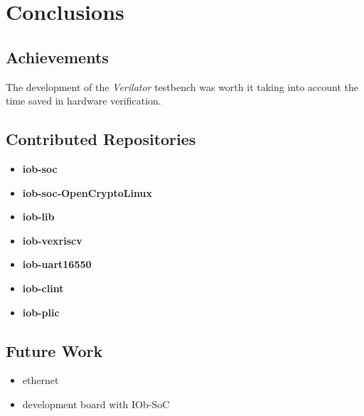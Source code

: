 \chapter{Conclusions}
\label{chapter:conclusions}

\section{Achievements}
\label{section:achievements}
The development of the \textit{Verilator} testbench was worth it taking into account the time saved in hardware verification.

\section{Contributed Repositories}
\label{section:contributions}
\begin{itemize}
    \item \textbf{iob-soc}
    \item \textbf{iob-soc-OpenCryptoLinux}
    \item \textbf{iob-lib}
    \item \textbf{iob-vexriscv}
    \item \textbf{iob-uart16550}
    \item \textbf{iob-clint}
    \item \textbf{iob-plic}
\end{itemize}

\section{Future Work}
\label{section:future}
\begin{itemize}
    \item ethernet
    \item development board with IOb-SoC
\end{itemize}
